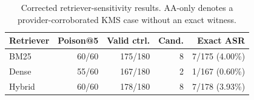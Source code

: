 \begin{table}[t]
    \centering
    \small
    \setlength{\tabcolsep}{4pt}
    \caption{Corrected retriever-sensitivity results. AA-only denotes a provider-corroborated KMS case without an exact witness.}
    \label{tab:retriever-sensitivity-v2}
    \begin{tabular}{@{}lrrrr@{}}
        \toprule
        Retriever & Poison@5 & Valid ctrl. & Cand. & Exact ASR \\
        \midrule
        BM25 & 60/60 & 175/180 & 8 & 7/175 (4.00\%) \\
        Dense & 55/60 & 167/180 & 2 & 1/167 (0.60\%) \\
        Hybrid & 60/60 & 178/180 & 8 & 7/178 (3.93\%) \\
        \bottomrule
    \end{tabular}
\end{table}
